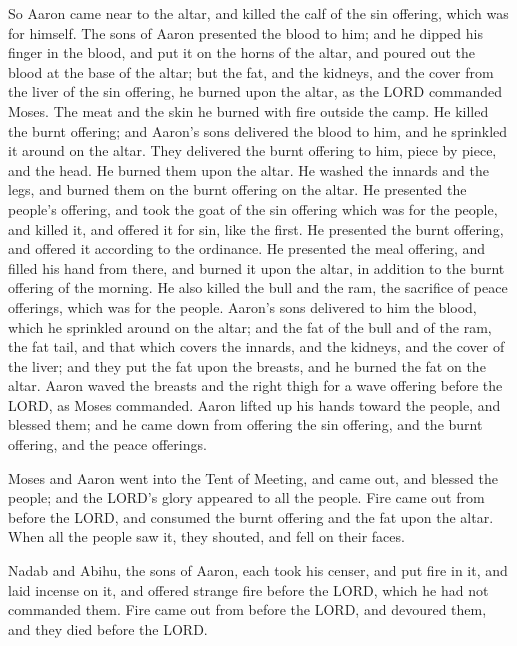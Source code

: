 \myverse{}So Aaron came near to the altar, and killed the calf of the sin
offering, which was for himself.
\myverse{}The sons of Aaron presented the blood to him; and he dipped his finger in the
blood, and put it on the horns of the altar, and poured out the blood at the base of the altar;
\myverse{}but the fat, and the kidneys, and the cover from the liver of the sin offering,
he burned upon the altar, as the LORD commanded Moses.
\myverse{}The meat and the skin he burned with fire outside the camp.
\myverse{}He killed the burnt offering; and Aaron’s sons delivered the blood to him,
and he sprinkled it around on the altar.
\myverse{}They delivered the burnt offering to him, piece by piece, and the head. He
burned them upon the altar.
\myverse{}He washed the innards and the legs, and burned them on the burnt offering
on the altar.
\myverse{}He presented the people’s offering, and took the goat of the sin offering
which was for the people, and killed it, and offered it for sin, like the first.
\myverse{}He presented the burnt offering, and offered it according to the ordinance.
\myverse{}He presented the meal offering, and filled his hand from there, and burned
it upon the altar, in addition to the burnt offering of the morning.
\myverse{}He also killed the bull and the ram, the sacrifice of peace offerings, which
was for the people. Aaron’s sons delivered to him the blood, which he sprinkled around on the altar;
\myverse{}and the fat of the bull and of the ram, the fat tail, and that which covers
the innards, and the kidneys, and the cover of the liver;
\myverse{}and they put the fat upon the breasts, and he burned the fat on the altar.
\myverse{}Aaron waved the breasts and the right thigh for a wave offering before the
LORD, as Moses commanded.
\myverse{}Aaron lifted up his hands toward the people, and blessed them; and he came
down from offering the sin offering, and the burnt offering, and the peace offerings.


\myverse{}Moses and Aaron went into the Tent of Meeting, and came out,
and blessed the people; and the LORD’s glory appeared to all the people.
\myverse{}Fire came out from before the LORD, and consumed the burnt offering and the
fat upon the altar. When all the people saw it, they shouted, and fell on their faces.


\mychapter{} \myverse*{}Nadab and Abihu, the sons of Aaron, each took his censer, and
put fire in it, and laid incense on it, and offered strange fire before the LORD, which he had not commanded
them.
\myverse{}Fire came out from before the LORD, and devoured them, and they died before
the LORD.


